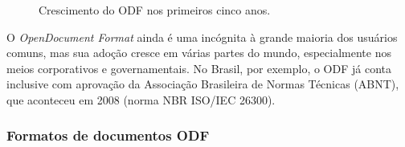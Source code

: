 \begin{figure}[ht]
    \centering
    \caption{Crescimento do ODF nos primeiros cinco anos.}
    \label{crescimento_odf}
\end{figure}

\begin{citacao}
O \textit{OpenDocument Format} ainda é uma incógnita à grande maioria dos usuários comuns, mas sua adoção cresce em várias partes do mundo, especialmente nos meios corporativos e governamentais. No Brasil, por exemplo, o ODF já conta inclusive com aprovação da Associação Brasileira de Normas Técnicas (ABNT), que aconteceu em 2008 (norma NBR ISO/IEC 26300)\cite{ALECRIM-ODF}.
\end{citacao}

\subsubsection{Formatos de documentos ODF}


